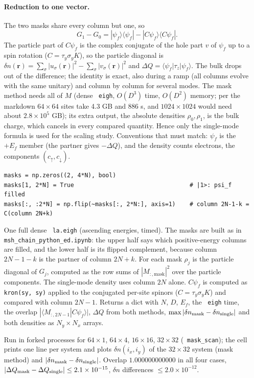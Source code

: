 \documentclass[11pt]{article}
\renewenvironment{function}[1]{\par\Needspace{7\baselineskip}\medskip\noindent{\raggedright\textbf{\large\texttt{\hyphenchar\font=-1 #1}}\par}\nopagebreak}{\par\medskip}
\renewcommand{\code}[1]{\texttt{\hyphenchar\font=-1 #1}}
\newcommand{\ket}[1]{|#1\rangle}
\newcommand{\bra}[1]{\langle#1|}
\begin{document}
\paragraph{Reduction to one vector.} The two masks share every column but one, so
\[
G_1 - G_0 = \ket{\psi_f}\bra{\psi_f} - \ket{C\psi_f}\bra{C\psi_f}.
\]
The particle part of $C\psi_f$ is the complex conjugate of the hole part $v$ of $\psi_f$ up to a spin rotation ($C = \tau_y\sigma_yK$), so the
particle diagonal is $\delta n(\mathbf r) = \sum_\sigma|u_\sigma(\mathbf r)|^2 - \sum_\sigma|v_\sigma(\mathbf r)|^2$ and
$\Delta Q = \bra{\psi_f}\tau_z\ket{\psi_f}$. The bulk drops out of the difference; the identity is exact, also during a ramp (all columns evolve
with the same unitary) and column by column for several modes. The mask method needs all of $M$ (dense \code{eigh}, $O(D^3)$ time, $O(D^2)$
memory; per the markdown $64\times64$ sites take 4.3 GB and 886 s, and $1024\times1024$ would need about $2.8\times10^5$ GB); its extra output, the
absolute densities $\rho_0,\rho_1$, is the bulk charge, which cancels in every compared quantity. Hence only the single-mode formula is used for the
scaling study. Conventions that must match: $\psi_f$ is the $+E_f$ member (the partner gives $-\Delta Q$), and the density counts electrons,
the components $(c_\uparrow, c_\downarrow)$.

\begin{function}{mask\_check(Lx, Ly, ell=12)}
\begin{Verbatim}
masks = np.zeros((2, 4*N), bool)
masks[1, 2*N] = True                                 # |1>: psi_f filled
masks[:, :2*N] = np.flip(~masks[:, 2*N:], axis=1)    # column 2N-1-k = C(column 2N+k)
\end{Verbatim}
One full dense \code{la.eigh} (ascending energies, timed). The masks are built as in \code{msh\_chain\_python\_ed.ipynb}: the upper half
says which positive-energy columns are filled, and the lower half is its flipped complement, because column $2N-1-k$ is the partner of column
$2N+k$. For each mask $\rho_j$ is the particle diagonal of $G_j$, computed as the row sums of $|M_{:,\text{mask}}|^2$ over the particle
components. The single-mode density uses column $2N$ alone. $C\psi_f$ is computed as \code{kron(sy, sy)} applied to the conjugated per-site
spinors ($C = \tau_y\sigma_yK$) and compared with column $2N-1$. Returns a dict with $N$, $D$, $E_f$, the \code{eigh} time, the overlap
$|\langle M_{:,2N-1}|C\psi_f\rangle|$, $\Delta Q$ from both methods, $\max|\delta n_{\rm mask}-\delta n_{\rm single}|$ and both densities as
$N_y\times N_x$ arrays.
\end{function}
Run in forked processes for $64\times1$, $64\times4$, $16\times16$, $32\times32$ (\code{mask\_scan}); the cell prints one line per system and plots
$\delta n(i_x,i_y)$ of the $32\times32$ system (mask method) and $|\delta n_{\rm mask}-\delta n_{\rm single}|$. Overlap $1.000000000000$ in all four cases, $|\Delta Q_{\rm mask}-\Delta Q_{\rm single}|\le2.1\times10^{-15}$, $\delta n$ differences $\le2.0\times10^{-12}$.
\end{document}
